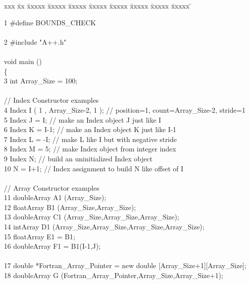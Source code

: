 {\footnotesize
\begin{tabbing}
xxx \= xx \= xxxxx \= xxxxx \= xxxxx \= xxxxx \= xxxxx \= xxxxx \= xxxxx \= xxxxx \= \kill

1   \> \#define BOUNDS\_CHECK \\
    \\
2   \> \#include "A++.h" \\
    \\
    \> void main () \\
    \> \{ \\
3   \>\>  int Array\_Size = 100; \\
    \\
    \>// Index Constructor examples \\
4   \>\> Index I ( 1 , Array\_Size-2, 1 ); \>\>\>\>\> // position=1, count=Array\_Size-2, stride=1 \\
5   \>\> Index J = I;                      \>\>\>\>\> // make an Index object J just like  I \\
6   \>\> Index K = I-1;                    \>\>\>\>\> // make an Index object K just like I-1 \\
7   \>\> Index L = -I;                     \>\>\>\>\> // make L like I but with negative stride \\
8   \>\> Index M = 5;                      \>\>\>\>\> // make Index object from integer index \\
9   \>\> Index N;                          \>\>\>\>\> // build an uninitialized Index object \\
10  \>\> N = I+1;                          \>\>\>\>\> // Index assignment to build N like offset of I \\
    \\
    \> // Array Constructor examples \\ 
11  \>\> doubleArray A1 (Array\_Size); \\ 
12  \>\> floatArray B1 (Array\_Size,Array\_Size); \\ 
13  \>\> doubleArray C1 (Array\_Size,Array\_Size,Array\_Size); \\ 
14  \>\> intArray D1 (Array\_Size,Array\_Size,Array\_Size,Array\_Size); \\ 
15  \>\> floatArray E1 = B1; \\ 
16  \>\> doubleArray F1 = B1(I-1,J); \\ 
    \\
17  \>\> double *Fortran\_Array\_Pointer = new double [Array\_Size+1][Array\_Size]; \\ 
18  \>\> doubleArray G (Fortran\_Array\_Pointer,Array\_Size,Array\_Size+1); \\ 

\end{tabbing}}
